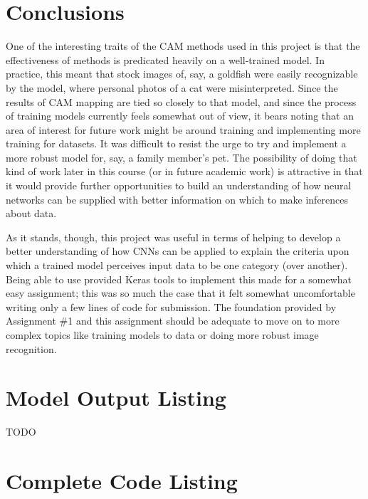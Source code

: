 \documentclass{article}
\begin{document}
\section{Conclusions}
One of the interesting traits of the CAM methods used in this project is that the effectiveness of methods is predicated heavily on a well-trained model.
In practice, this meant that stock images of, say, a goldfish were easily recognizable by the model, where personal photos of a cat were misinterpreted.
Since the results of CAM mapping are tied so closely to that model, and since the process of training models currently feels somewhat out of view, it bears noting that an area of interest for future work might be around training and implementing more training for datasets. It was difficult to resist the urge to try and implement a more robust model for, say, a family member's pet. 
The possibility of doing that kind of work later in this course (or in future academic work) is attractive in that it would provide further opportunities to build an understanding of how neural networks can be supplied with better information on which to make inferences about data.

\par As it stands, though, this project was useful in terms of helping to develop a better understanding of how CNNs can be applied to explain the criteria upon which a trained model perceives input data to be one category (over another).
Being able to use provided Keras tools to implement this made for a somewhat easy assignment; this was so much the case that it felt somewhat uncomfortable writing only a few lines of code for submission.
The foundation provided by Assignment \#1 and this assignment should be adequate to move on to more complex topics like training models to data or doing more robust image recognition.

\begin{appendices}

\newpage
\section{Model Output Listing} \label{modelouts}
TODO
\newpage
\section{Complete Code Listing} \label{codelist}

\end{appendices}



\end{document}
